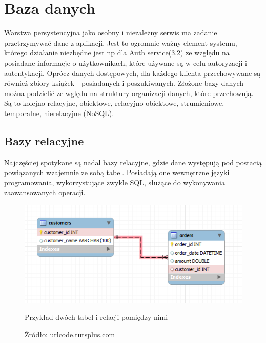 \section{Baza danych}
Warstwa persystencyjna jako osobny i niezależny serwis ma zadanie przetrzymywać dane z aplikacji. Jest to ogromnie ważny element systemu, którego działanie niezbędne jest np dla Auth service(3.2) ze względu na posiadane informacje o użytkownikach, które używane są w celu autoryzacji i autentykacji.
Oprócz danych dostępowych, dla każdego klienta przechowywane są również zbiory książek - posiadanych i poszukiwanych.
Złożone bazy danych można podzielić ze wględu na struktury organizacji danych, które przechowują. Są to kolejno relacyjne, obiektowe, relacyjno-obiektowe, strumieniowe, temporalne, nierelacyjne (NoSQL).
\newpage
\subsection{Bazy relacyjne}
Najczęściej spotykane są nadal bazy relacyjne, gdzie dane występują pod postacią powiązanych wzajemnie ze sobą tabel. Posiadają one wewnętrzne języki programowania, wykorzystujące zwykle SQL, służące do wykonywania zaawansowanych operacji.
\begin{figure}[H]
	\centering
	\includegraphics[width=\linewidth]{relations.png}
	\caption{Przykład dwóch tabel i relacji pomiędzy nimi}
	\caption*{Źródło: url{code.tutsplus.com}}
\end{figure}

